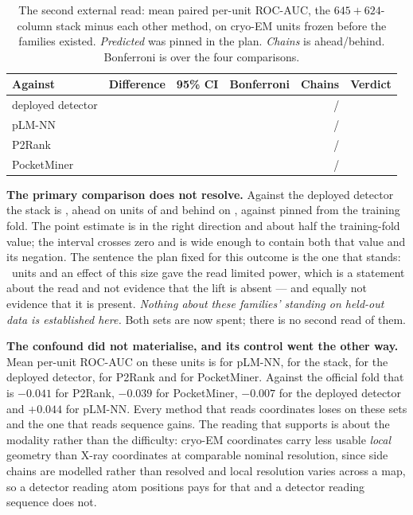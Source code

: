 \documentclass[11pt]{article}
\begin{document}
\begin{table}[t]
\centering
\small
\caption{The second external read: mean paired per-unit ROC-AUC, the
\(645+624\)-column stack minus each other method, on \BcN{} cryo-EM units frozen
before the families existed. \emph{Predicted} was pinned in the plan.
\emph{Chains} is ahead/behind. Bonferroni is over the four comparisons.}
\label{tab:setbc}
\begin{tabular}{lrrrrl}
\toprule
Against & Difference & 95\% CI & Bonferroni & Chains & Verdict \\
\midrule
deployed detector & \BcOurs{} & \BcOursCI{} & \BcOursBonf{} &
  \BcOursWin{}/\BcOursLoss{} & \BcOursVerdict{} \\
pLM-NN & \BcPlm{} & \BcPlmCI{} & \BcPlmBonf{} &
  \BcPlmWin{}/\BcPlmLoss{} & \BcPlmVerdict{} \\
P2Rank & \BcPtwoR{} & \BcPtwoRCI{} & \BcPtwoRBonf{} &
  \BcPtwoRWin{}/\BcPtwoRLoss{} & \BcPtwoRVerdict{} \\
PocketMiner & \BcPm{} & \BcPmCI{} & \BcPmBonf{} &
  \BcPmWin{}/\BcPmLoss{} & \BcPmVerdict{} \\
\bottomrule
\end{tabular}
\end{table}

\textbf{The primary comparison does not resolve.} Against the deployed detector
the stack is \BcOurs{} \BcOursCI{}, ahead on \BcOursWin{} units of \BcN{} and
behind on \BcOursLoss{}, against \BcOursPred{} pinned from the training fold. The
point estimate is in the right direction and about half the training-fold value;
the interval crosses zero and is wide enough to contain both that value and its
negation. The sentence the plan fixed for this outcome is the one that stands:
\BcN{}~units and an effect of this size gave the read limited power, which is a
statement about the read and not evidence that the lift is absent --- and equally
not evidence that it is present. \emph{Nothing about these families' standing on
held-out data is established here.} Both sets are now spent; there is no second
read of them.

\textbf{The confound did not materialise, and its control went the other way.}
Mean per-unit ROC-AUC on these units is \BcLevelPlm{} for pLM-NN, \BcLevelGeo{}
for the stack, \BcLevelOurs{} for the deployed detector, \BcLevelPtwoR{} for
P2Rank and \BcLevelPm{} for PocketMiner. Against the official fold that is
\(-0.041\) for P2Rank, \(-0.039\) for PocketMiner, \(-0.007\) for the deployed
detector and \(+0.044\) for pLM-NN. Every method that reads coordinates loses on
these sets and the one that reads sequence gains. The reading that supports is
about the modality rather than the difficulty: cryo-EM coordinates carry less
usable \emph{local} geometry than X-ray coordinates at comparable nominal
resolution, since side chains are modelled rather than resolved and local
resolution varies across a map, so a detector reading atom positions pays for that
and a detector reading sequence does not.
\end{document}
